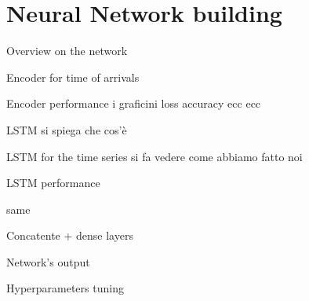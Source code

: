 \documentclass{beamer}
\begin{document}
\section{Neural Network building}


\begin{frame}{Overview on the network}

    
\end{frame}

\begin{frame}{Encoder for time of arrivals}

    
\end{frame}
\begin{frame}{Encoder performance}
i graficini loss accuracy ecc ecc
    
\end{frame}

\begin{frame}{LSTM}
si spiega che cos'è
    
\end{frame}

\begin{frame}{LSTM for the time series}
si fa vedere come abbiamo fatto noi
    
\end{frame}

\begin{frame}{LSTM performance}

    same
\end{frame}

\begin{frame}{Concatente + dense layers}

    
\end{frame}

\begin{frame}{Network's output}

    
\end{frame}

\begin{frame}{Hyperparameters tuning}

    
\end{frame}
\end{document}
